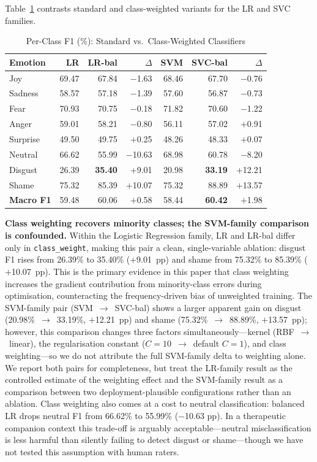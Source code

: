 \documentclass[conference]{IEEEtran}
\begin{document}
Table~\ref{tab:perclass} contrasts standard and class-weighted
variants for the LR and SVC families.

\begin{table}[htbp]
\centering
\caption{Per-Class F1 (\%): Standard vs.\ Class-Weighted Classifiers}
\label{tab:perclass}
\begin{tabular}{lrrrrrr}
\toprule
\textbf{Emotion} &
\textbf{LR} & \textbf{LR-bal} & \textbf{$\Delta$} &
\textbf{SVM} & \textbf{SVC-bal} & \textbf{$\Delta$} \\
\midrule
Joy      & 69.47 & 67.84 & $-$1.63 & 68.46 & 67.70 & $-$0.76 \\
Sadness  & 58.57 & 57.18 & $-$1.39 & 57.60 & 56.87 & $-$0.73 \\
Fear     & 70.93 & 70.75 & $-$0.18 & 71.82 & 70.60 & $-$1.22 \\
Anger    & 59.01 & 58.21 & $-$0.80 & 56.11 & 57.02 & $+$0.91 \\
Surprise & 49.50 & 49.75 & $+$0.25 & 48.26 & 48.33 & $+$0.07 \\
Neutral  & 66.62 & 55.99 & $-$10.63& 68.98 & 60.78 & $-$8.20 \\
Disgust  & 26.39 & \textbf{35.40} & $+$9.01  &
           20.98 & \textbf{33.19} & $+$12.21 \\
Shame    & 75.32 & 85.39 & $+$10.07 & 75.32 & 88.89 & $+$13.57 \\
\midrule
\textbf{Macro F1} & 59.48 & 60.06 & $+$0.58 &
                    58.44 & \textbf{60.42} & $+$1.98 \\
\bottomrule
\end{tabular}
\end{table}

\textbf{Class weighting recovers minority classes; the SVM-family
comparison is confounded.}
Within the Logistic Regression family, LR and LR-bal differ only
in \texttt{class\_weight}, making this pair a clean, single-variable
ablation: disgust F1 rises from 26.39\% to 35.40\% ($+$9.01~pp)
and shame from 75.32\% to 85.39\% ($+$10.07~pp).
This is the primary evidence in this paper that class weighting
increases the gradient contribution from minority-class errors
during optimisation, counteracting the frequency-driven bias of
unweighted training.
The SVM-family pair (SVM~$\to$~SVC-bal) shows a larger apparent
gain on disgust (20.98\%~$\to$~33.19\%, $+$12.21~pp) and shame
(75.32\%~$\to$~88.89\%, $+$13.57~pp); however, this comparison
changes three factors simultaneously---kernel (RBF~$\to$~linear),
the regularisation constant ($C{=}10$~$\to$~default $C{=}1$), and
class weighting---so we do not attribute the full SVM-family
delta to weighting alone.
We report both pairs for completeness, but treat the LR-family
result as the controlled estimate of the weighting effect and
the SVM-family result as a comparison between two
deployment-plausible configurations rather than an ablation.
Class weighting also comes at a cost to neutral classification:
balanced LR drops neutral F1 from 66.62\% to 55.99\%
($-$10.63 pp).
In a therapeutic companion context this trade-off is arguably
acceptable---neutral misclassification is less harmful than
silently failing to detect disgust or shame---though we have not
tested this assumption with human raters.
\end{document}
